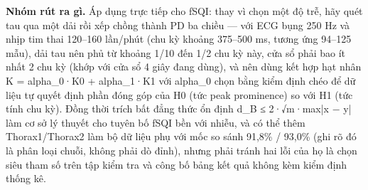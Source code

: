 \documentclass[12pt,a4paper]{article}
\begin{document}
\noindent \textbf{\color{tdtblue}Nhóm rút ra gì.} Áp dụng trực tiếp cho fSQI: thay vì chọn một độ trễ, hãy quét tau qua một dải rồi xếp chồng thành PD ba chiều — với ECG bụng 250 Hz và nhịp tim thai 120–160 lần/phút (chu kỳ khoảng 375–500 ms, tương ứng 94–125 mẫu), dải tau nên phủ từ khoảng 1/10 đến 1/2 chu kỳ này, cửa sổ phải bao ít nhất 2 chu kỳ (khớp với cửa sổ 4 giây đang dùng), và nên dùng kết hợp hạt nhân K = alpha\_0·K0 + alpha\_1·K1 với alpha\_0 chọn bằng kiểm định chéo để dữ liệu tự quyết định phần đóng góp của H0 (tức peak prominence) so với H1 (tức tính chu kỳ). Đồng thời trích bất đẳng thức ổn định d\_B ≤ 2·√m·max|x − y| làm cơ sở lý thuyết cho tuyên bố fSQI bền với nhiễu, và có thể thêm Thorax1/Thorax2 làm bộ dữ liệu phụ với mốc so sánh 91,8\% / 93,0\% (ghi rõ đó là phân loại chuỗi, không phải dò đỉnh), nhưng phải tránh hai lỗi của họ là chọn siêu tham số trên tập kiểm tra và công bố bảng kết quả không kèm kiểm định thống kê.\par\vspace{3pt}
\vspace{6pt}
\end{document}
